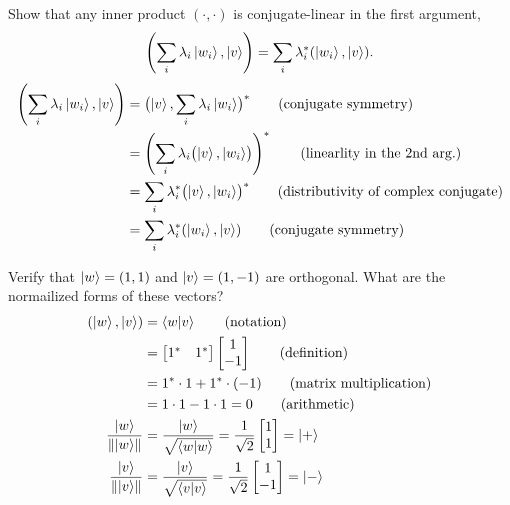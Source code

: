  Show that any inner product $(\cdot,\cdot)$ is conjugate-linear in the first argument,
\[
\left(\sum_i \lambda_i\ket{w_i}, \ket{v}\right) = \sum_i \lambda_i^{*}(\ket{w_i}, \ket{v}).
\]
\Soln
\begin{align*}
	\left(\sum_i \lambda_i \ket{w_i},\ket{v}\right) &=
	\bigl(\ket{v},\sum_i \lambda_i \ket{w_i}\bigr)^* \tag{conjugate symmetry}\\
	&= \left(\sum_i \lambda_i \bigl(\ket{v},\ket{w_i}  \bigr) \right)^*\tag{linearlity in the 2nd arg.}\\
	&= \sum_i \lambda_i^* \bigl(\ket{v},\ket{w_i} \bigr)^* \tag{distributivity of complex conjugate}\\
	&= \sum_i \lambda_i^* (\ket{w_i},\ket{v}) \tag{conjugate symmetry}
\end{align*}


 Verify that $\ket{w} = (1,1)$ and $\ket{v} = (1,-1)$ are orthogonal.  What are the normailized forms of these vectors?
\Soln
\begin{align*}
	 (\ket{w}, \ket{v}) &= 	\braket{w | v} \tag{notation} \\
	 &= \begin{bmatrix}
		1^* & 1^*
		\end{bmatrix}
		\begin{bmatrix}
		1 \\
		-1
		\end{bmatrix} \tag{definition}\\
	&= 1^*\cdot1 + 1^*\cdot(-1) \tag{matrix multiplication} \\
	&= 1\cdot1 - 1\cdot1 = 0 \tag{arithmetic}\\
%
	\frac{\ket{w}}{\norm{\ket{w}}} &=
	\frac{\ket{w}}{\sqrt{\braket{w|w}}} = \frac{1}{\sqrt{2}} \begin{bmatrix}
	1 \\
	1
	\end{bmatrix}
	= \ket{+} \\
%
	\frac{\ket{v}}{\norm{\ket{v}}} &=
	\frac{\ket{v}}{\sqrt{\braket{v|v}}} = \frac{1}{\sqrt{2}} \begin{bmatrix}
	1 \\
	-1
	\end{bmatrix}
	=\ket{-}
\end{align*}



